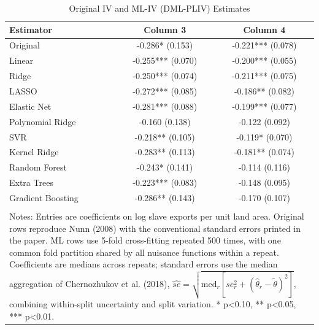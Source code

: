 \begin{table}
\caption{Original IV and ML-IV (DML-PLIV) Estimates}
\label{tab:iv_vs_mliv_table}
\begin{tabular}{lcc}
\toprule
Estimator & Column 3 & Column 4 \\
\midrule
Original & -0.286* (0.153) & -0.221*** (0.078) \\
Linear & -0.255*** (0.070) & -0.200*** (0.055) \\
Ridge & -0.250*** (0.074) & -0.211*** (0.075) \\
LASSO & -0.272*** (0.085) & -0.186** (0.082) \\
Elastic Net & -0.281*** (0.088) & -0.199*** (0.077) \\
Polynomial Ridge & -0.160 (0.138) & -0.122 (0.092) \\
SVR & -0.218** (0.105) & -0.119* (0.070) \\
Kernel Ridge & -0.283** (0.113) & -0.181** (0.074) \\
Random Forest & -0.243* (0.141) & -0.114 (0.116) \\
Extra Trees & -0.223*** (0.083) & -0.148 (0.095) \\
Gradient Boosting & -0.286** (0.143) & -0.170 (0.107) \\
\bottomrule
\\[-0.5em]
\multicolumn{3}{p{0.95\linewidth}}{\footnotesize Notes: Entries are coefficients on log slave exports per unit land area. Original rows reproduce Nunn (2008) with the conventional standard errors printed in the paper. ML rows use 5-fold cross-fitting repeated 500 times, with one common fold partition shared by all nuisance functions within a repeat. Coefficients are medians across repeats; standard errors use the median aggregation of Chernozhukov et al. (2018), $\widehat{se} = \sqrt{\mathrm{med}_r[se_r^2 + (\hat\theta_r - \tilde\theta)^2]}$, combining within-split uncertainty and split variation. * p<0.10, ** p<0.05, *** p<0.01.}\\
\end{tabular}
\end{table}
